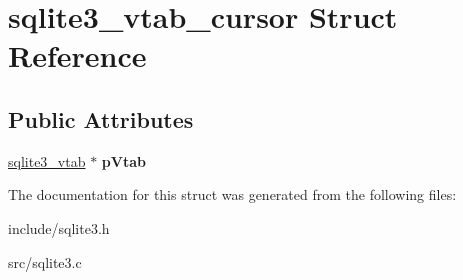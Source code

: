 \hypertarget{structsqlite3__vtab__cursor}{\section{sqlite3\-\_\-vtab\-\_\-cursor Struct Reference}
\label{structsqlite3__vtab__cursor}
}
\subsection*{Public Attributes}
\begin{DoxyCompactItemize}
\item 
\hypertarget{structsqlite3__vtab__cursor_a7bb57f3f9c7c618a9d6d33c6d9820bdc}{\hyperlink{structsqlite3__vtab}{sqlite3\-\_\-vtab} $\ast$ {\bfseries p\-Vtab}}\label{structsqlite3__vtab__cursor_a7bb57f3f9c7c618a9d6d33c6d9820bdc}

\end{DoxyCompactItemize}


The documentation for this struct was generated from the following files\-:\begin{DoxyCompactItemize}
\item 
include/sqlite3.\-h\item 
src/sqlite3.\-c\end{DoxyCompactItemize}
